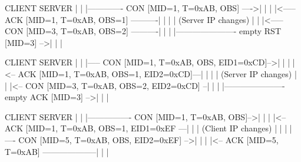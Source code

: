 
\begin{myverbbox}{\observewithouteid}
CLIENT                                       SERVER
  |                                            |
  |------------- CON [MID=1, T=0xAB, OBS] ---->|
  |                                            |
  |<----- ACK [MID=1, T=0xAB, OBS=1] ----------|
  |                                            |
  |                             (Server IP changes)
  |                                            |
  |<----- CON [MID=3, T=0xAB, OBS=2] ----------|
  |                                            |
  |---------------------- empty RST [MID=3] -->|
  |                                            |
\end{myverbbox}


\begin{myverbbox}{\observewitheid}
CLIENT                                       SERVER
  |                                            |
  |----- CON [MID=1, T=0xAB, OBS, EID1=0xCD]-->|
  |                                            |
  |<-- ACK [MID=1, T=0xAB, OBS=1, EID2=0xCD]---|
  |                                            |
  |                                    (Server IP changes)
  |                                            |
  |<-- CON [MID=3, T=0xAB, OBS=2, EID2=0xCD] --|
  |                                            |
  |---------------------- empty ACK [MID=3] -->|
  |                                            |
\end{myverbbox}


\begin{myverbbox}{\eidforclient}
   CLIENT                                       SERVER
      |                                            |
      |---------------- CON [MID=1, T=0xAB, OBS]-->|
      |                                            |
      |<-- ACK [MID=1, T=0xAB, OBS=1, EID1=0xEF ---|
      |                                            |
(Client IP changes)                                |
      |                                            |
      |---- CON [MID=5, T=0xAB, OBS, EID2=0xEF] -->|
      |                                            |
      |<-- ACK [MID=5, T=0xAB] --------------------|
      |                                            |
\end{myverbbox}


